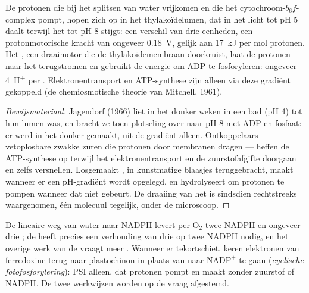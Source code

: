 \begin{theorem}\label{thm:b1:photosynthesis:chemiosmosis}
De protonen die bij het splitsen van water vrijkomen en die het
cytochroom-$b_6f$-complex pompt, hopen zich op in het thylakoïdelumen, dat in het
licht tot pH 5 daalt terwijl het  tot pH 8 stijgt: een verschil van drie
eenheden, een protonmotorische kracht van ongeveer \qty{0.18}{V}, gelijk aan
\qty{17}{kJ} per mol protonen. Het \emph{}, een draaimotor die de
thylakoïdemembraan doorkruist, laat de protonen naar het  terugstromen en
gebruikt de energie om ADP te fosforyleren: ongeveer \qty{4}{H^+} per .
Elektronentransport en ATP-synthese zijn alleen via deze gradiënt gekoppeld (de
chemiosmotische theorie van Mitchell, 1961).
\end{theorem}
\begin{proof}[Bewijsmateriaal]
Jagendorf (1966) liet  in het donker weken in een  bad (pH 4) tot
hun lumen  was, en bracht ze toen plotseling over naar pH 8 met ADP en fosfaat:
er werd in het donker  gemaakt, uit de gradiënt alleen. Ontkoppelaars ---
vetoplosbare zwakke zuren die protonen door membranen dragen --- heffen de
ATP-synthese op terwijl het elektronentransport en de zuurstofafgifte doorgaan en
zelfs versnellen. Losgemaakt , in kunstmatige blaasjes teruggebracht,
maakt  wanneer er een pH-gradiënt wordt opgelegd, en hydrolyseert  om
protonen te pompen wanneer dat niet gebeurt. De draaiing van het  is sindsdien
rechtstreeks waargenomen, één molecuul tegelijk, onder de microscoop.
\end{proof}

\begin{example}\label{ex:b1:photosynthesis:cyclic}
De lineaire weg van water naar NADPH levert per $\mathrm{O_2}$ twee NADPH en
ongeveer drie ; de  heeft precies een verhouding van drie  op
twee NADPH nodig, en het overige werk van de  vraagt meer . Wanneer
er  tekortschiet, keren elektronen van ferredoxine terug naar plastochinon in
plaats van naar $\mathrm{NADP^+}$ te gaan (\emph{cyclische fotofosforylering}):
PSI alleen, dat protonen pompt en  maakt zonder zuurstof of NADPH. De twee
werkwijzen worden op de vraag afgestemd.
\end{example}

